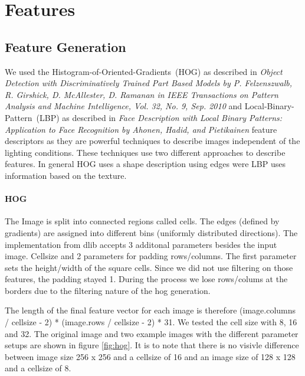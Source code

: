\documentclass[a4paper,10pt]{article}
\begin{document}
\section{Features}
\subsection{Feature Generation}

We used the Histogram-of-Oriented-Gradients~(HOG) as described in \emph{Object Detection with Discriminatively Trained Part Based Models by P. Felzenszwalb, R. Girshick, D. McAllester, D. Ramanan in IEEE Transactions on Pattern Analysis and Machine Intelligence, Vol. 32, No. 9, Sep. 2010}
and Local-Binary-Pattern~(LBP) as described in \emph{Face Description with Local Binary Patterns: Application to Face Recognition by Ahonen, Hadid, and Pietikainen}
feature descriptors as they are powerful techniques to describe images independent of the lighting conditions.
These techniques use two different approaches to describe features. In general HOG uses a shape description using edges were LBP uses information based on the texture.

\paragraph{HOG} 
The Image is split into connected regions called cells. The edges (defined by gradients) are assigned into different bins (uniformly distributed directions).
The implementation from dlib accepts 3 additonal parameters besides the input image.
Cellsize and 2 parameters for padding rows/columns. The first parameter sets the height/width of the square cells. 
Since we did not use filtering on those features, the padding stayed 1. During the process we lose rows/colums at the borders due to the filtering nature of the hog generation.

The length of the final feature vector for each image is therefore (image.columns / cellsize - 2)  * (image.rows / cellsize - 2) * 31.
We tested the cell size with 8, 16 and 32.
The original image and two example images with the different parameter setups are shown in figure \ref{fig:hog}.
It is to note that there is no visivle difference between image size 256 x 256 and a cellsize of 16 and an image size of 128 x 128 and a cellsize of 8.
\end{document}
